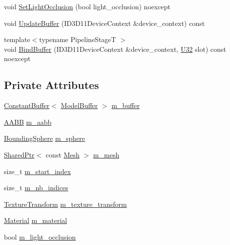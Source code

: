 \begin{DoxyCompactItemize}
\item 
void \mbox{\hyperlink{classmage_1_1rendering_1_1_model_a4064c86786e7dca7907435da1dce83a4}{Set\+Light\+Occlusion}} (bool light\+\_\+occlusion) noexcept
\item 
void \mbox{\hyperlink{classmage_1_1rendering_1_1_model_a31b3d4f544c8cfea4ad2054d594b2c53}{Update\+Buffer}} (I\+D3\+D11\+Device\+Context \&device\+\_\+context) const
\item 
{\footnotesize template$<$typename Pipeline\+StageT $>$ }\\void \mbox{\hyperlink{classmage_1_1rendering_1_1_model_a1247b104dff5f0eb1039b6e3ac0213ae}{Bind\+Buffer}} (I\+D3\+D11\+Device\+Context \&device\+\_\+context, \mbox{\hyperlink{namespacemage_aa5d6eaabaac3cdd01873d6a3d27e90f3}{U32}} slot) const noexcept
\end{DoxyCompactItemize}
\subsection*{Private Attributes}
\begin{DoxyCompactItemize}
\item 
\mbox{\hyperlink{classmage_1_1rendering_1_1_constant_buffer}{Constant\+Buffer}}$<$ \mbox{\hyperlink{structmage_1_1rendering_1_1_model_buffer}{Model\+Buffer}} $>$ \mbox{\hyperlink{classmage_1_1rendering_1_1_model_a82132035b4631143bed489c4bc190f95}{m\+\_\+buffer}}
\item 
\mbox{\hyperlink{classmage_1_1_a_a_b_b}{A\+A\+BB}} \mbox{\hyperlink{classmage_1_1rendering_1_1_model_a7b3bb86ad718ba3dae2b1c6042fdeaec}{m\+\_\+aabb}}
\item 
\mbox{\hyperlink{classmage_1_1_bounding_sphere}{Bounding\+Sphere}} \mbox{\hyperlink{classmage_1_1rendering_1_1_model_a88220cb828f0df79489c512245560616}{m\+\_\+sphere}}
\item 
\mbox{\hyperlink{namespacemage_a1e01ae66713838a7a67d30e44c67703e}{Shared\+Ptr}}$<$ const \mbox{\hyperlink{classmage_1_1rendering_1_1_mesh}{Mesh}} $>$ \mbox{\hyperlink{classmage_1_1rendering_1_1_model_a38be646490affe6bd2f2f2bb61d04caa}{m\+\_\+mesh}}
\item 
size\+\_\+t \mbox{\hyperlink{classmage_1_1rendering_1_1_model_a6144f71f0f1d539f5664b07088859751}{m\+\_\+start\+\_\+index}}
\item 
size\+\_\+t \mbox{\hyperlink{classmage_1_1rendering_1_1_model_abc3536c8511523e459fd245ef3c487f2}{m\+\_\+nb\+\_\+indices}}
\item 
\mbox{\hyperlink{classmage_1_1_texture_transform}{Texture\+Transform}} \mbox{\hyperlink{classmage_1_1rendering_1_1_model_a00ad04fc770af700b97f69c83dc01d70}{m\+\_\+texture\+\_\+transform}}
\item 
\mbox{\hyperlink{classmage_1_1rendering_1_1_material}{Material}} \mbox{\hyperlink{classmage_1_1rendering_1_1_model_a933d2f661f511908e7c1e9030cfc777d}{m\+\_\+material}}
\item 
bool \mbox{\hyperlink{classmage_1_1rendering_1_1_model_a796fd0c51ea194826dde990b10e70856}{m\+\_\+light\+\_\+occlusion}}
\end{DoxyCompactItemize}
